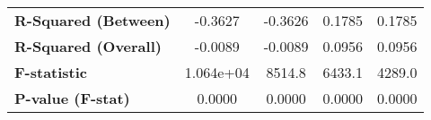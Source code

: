 {\begin{longtable}{>{\bfseries}lcccc}
\textbf{R-Squared (Between)}               &       -0.3627       &            -0.3626             &        0.1785       &              0.1785              \\
\textbf{R-Squared (Overall)}               &       -0.0089       &            -0.0089             &        0.0956       &              0.0956              \\
\textbf{F-statistic}                       &      1.064e+04      &             8514.8             &        6433.1       &              4289.0              \\
\textbf{P-value (F-stat)}                  &        0.0000       &             0.0000             &        0.0000       &              0.0000              \\
\bottomrule
\end{longtable}
}
